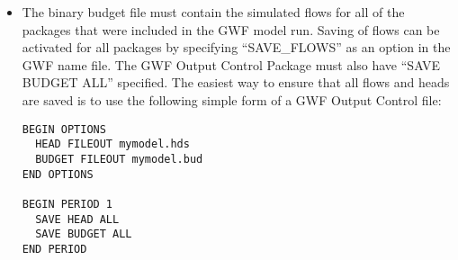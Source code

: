 \begin{itemize}
\begin{itemize}
\item The binary budget file must contain the simulated flows for all of the packages that were included in the GWF model run.  Saving of flows can be activated for all packages by specifying ``SAVE\_FLOWS'' as an option in the GWF name file.  The GWF Output Control Package must also have ``SAVE BUDGET ALL'' specified.  The easiest way to ensure that all flows and heads are saved is to use the following simple form of a GWF Output Control file:

\begin{verbatim}
BEGIN OPTIONS
  HEAD FILEOUT mymodel.hds
  BUDGET FILEOUT mymodel.bud
END OPTIONS

BEGIN PERIOD 1
  SAVE HEAD ALL
  SAVE BUDGET ALL
END PERIOD
\end{verbatim}


\end{itemize}
\end{itemize}
